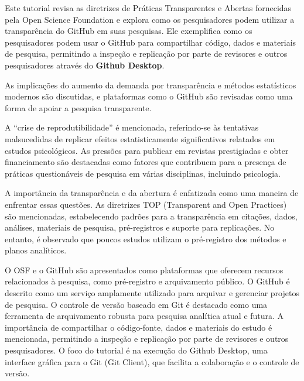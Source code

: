 \documentclass[
  a4paper,
]{article}
\begin{document}
\begin{tcolorbox}[enhanced jigsaw, toptitle=1mm, opacitybacktitle=0.6, colframe=quarto-callout-note-color-frame, rightrule=.15mm, coltitle=black, breakable, titlerule=0mm, colbacktitle=quarto-callout-note-color!10!white, colback=white, title=\textcolor{quarto-callout-note-color}{\faInfo}\hspace{0.5em}{@gilroy2019 \emph{Reading Note} (Tip~\ref{tip-prompt})}, left=2mm, leftrule=.75mm, opacityback=0, toprule=.15mm, bottomrule=.15mm, bottomtitle=1mm, arc=.35mm]

Este tutorial revisa as diretrizes de Práticas Transparentes e Abertas
fornecidas pela Open Science Foundation e explora como os pesquisadores
podem utilizar a transparência do GitHub em suas pesquisas. Ele
exemplifica como os pesquisadores podem usar o GitHub para compartilhar
código, dados e materiais de pesquisa, permitindo a inspeção e
replicação por parte de revisores e outros pesquisadores através do
\textbf{Github Desktop}.

As implicações do aumento da demanda por transparência e métodos
estatísticos modernos são discutidas, e plataformas como o GitHub são
revisadas como uma forma de apoiar a pesquisa transparente.

A ``crise de reprodutibilidade'' é mencionada, referindo-se às
tentativas malsucedidas de replicar efeitos estatisticamente
significativos relatados em estudos psicológicos. As pressões para
publicar em revistas prestigiadas e obter financiamento são destacadas
como fatores que contribuem para a presença de práticas questionáveis de
pesquisa em várias disciplinas, incluindo psicologia.

A importância da transparência e da abertura é enfatizada como uma
maneira de enfrentar essas questões. As diretrizes TOP (Transparent and
Open Practices) são mencionadas, estabelecendo padrões para a
transparência em citações, dados, análises, materiais de pesquisa,
pré-registros e suporte para replicações. No entanto, é observado que
poucos estudos utilizam o pré-registro dos métodos e planos analíticos.

O OSF e o GitHub são apresentados como plataformas que oferecem recursos
relacionados à pesquisa, como pré-registro e arquivamento público. O
GitHub é descrito como um serviço amplamente utilizado para arquivar e
gerenciar projetos de pesquisa. O controle de versão baseado em Git é
destacado como uma ferramenta de arquivamento robusta para pesquisa
analítica atual e futura. A importância de compartilhar o código-fonte,
dados e materiais do estudo é mencionada, permitindo a inspeção e
replicação por parte de revisores e outros pesquisadores. O foco do
tutorial é na execução do Github Desktop, uma interface gráfica para o
Git (Git Client), que facilita a colaboração e o controle de versão.


\end{tcolorbox}
\end{document}
